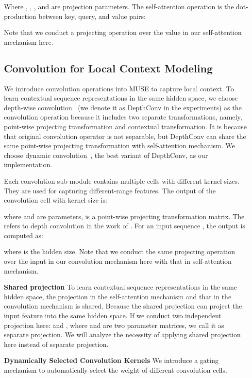 \documentclass{article} \usepackage{iclr2020_conference,times}
\begin{document}
Where , , , and  are projection parameters. The self-attention operation  is the dot-production between key, query, and value pairs:


Note that we conduct a projecting operation over the value in our self-attention mechanism  here.

\subsection{Convolution for Local Context Modeling} 
We introduce convolution operations into MUSE to capture local context. To learn contextual sequence representations in the same hidden space, we choose depth-wise convolution~\citep{Chollet_2017} (we denote it as DepthConv in the experiments) as the convolution operation because it includes two separate transformations, namely, point-wise projecting transformation and contextual transformation. It is because that original convolution operator is not separable, but DepthConv can share the same point-wise projecting transformation with  self-attention mechanism. We choose dynamic convolution~\citep{wu2019pay}, the best variant of DepthConv, as our implementation. 

Each convolution sub-module contains multiple cells with different kernel sizes. They are used for capturing different-range features. The output of the convolution cell with kernel size  is:

where  and  are parameters,  is a point-wise projecting transformation matrix. The  refers to depth convolution in the work of  \citet{wu2019pay}. For an input sequence , the output  is computed as: 

where  is the hidden size.
Note that we conduct the same projecting operation over the input in our convolution mechanism  here with that in self-attention mechanism. 

\textbf{Shared projection}
To learn contextual sequence representations in the same hidden space, the projection in the self-attention mechanism  and that in the convolution mechanism  is shared. Because the shared projection can project the input feature into the same hidden space. If we conduct two independent projection here:  and , where  and  are two parameter matrices, we call it as separate projection. We will analyze the necessity of applying shared projection here instead of separate projection.

\textbf{Dynamically Selected Convolution Kernels}
 We introduce a gating mechanism to automatically select the weight of different convolution cells. 
\end{document}
